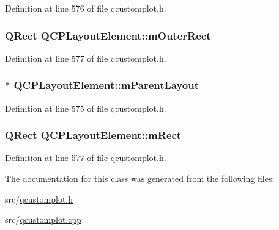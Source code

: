 Definition at line 576 of file qcustomplot.\-h.

\hypertarget{class_q_c_p_layout_element_a07bb4973379e75cb0fa5b032c1d24afd}{
\subsubsection[{m\-Outer\-Rect}]{\setlength{\rightskip}{0pt plus 5cm}Q\-Rect Q\-C\-P\-Layout\-Element\-::m\-Outer\-Rect\hspace{0.3cm}{\ttfamily [protected]}}}\label{class_q_c_p_layout_element_a07bb4973379e75cb0fa5b032c1d24afd}


Definition at line 577 of file qcustomplot.\-h.

\hypertarget{class_q_c_p_layout_element_ae7c75c25549608bd688bdb65d4c38066}{
\subsubsection[{m\-Parent\-Layout}]{$\ast$ Q\-C\-P\-Layout\-Element\-::m\-Parent\-Layout\hspace{0.3cm}{\ttfamily [protected]}}}\label{class_q_c_p_layout_element_ae7c75c25549608bd688bdb65d4c38066}


Definition at line 575 of file qcustomplot.\-h.

\hypertarget{class_q_c_p_layout_element_ad8896f05550389f7b9e92c9e6cdf6e01}{
\subsubsection[{m\-Rect}]{\setlength{\rightskip}{0pt plus 5cm}Q\-Rect Q\-C\-P\-Layout\-Element\-::m\-Rect\hspace{0.3cm}{\ttfamily [protected]}}}\label{class_q_c_p_layout_element_ad8896f05550389f7b9e92c9e6cdf6e01}


Definition at line 577 of file qcustomplot.\-h.



The documentation for this class was generated from the following files\-:\begin{DoxyCompactItemize}
\item 
src/\hyperlink{qcustomplot_8h}{qcustomplot.\-h}\item 
src/\hyperlink{qcustomplot_8cpp}{qcustomplot.\-cpp}\end{DoxyCompactItemize}
